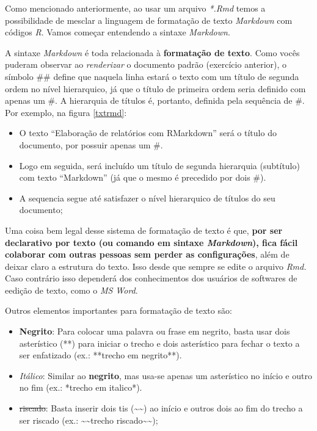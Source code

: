 \documentclass[]{book}
\providecommand{\tightlist}{%
  \setlength{\itemsep}{0pt}\setlength{\parskip}{0pt}}
\begin{document}
Como mencionado anteriormente, ao usar um arquivo \emph{*.Rmd} temos a possibilidade de mesclar a linguagem de formatação de texto \emph{Markdown} com códigos \emph{R}. Vamos começar entendendo a sintaxe \emph{Markdown}.

A sintaxe \emph{Markdown} é toda relacionada à \textbf{formatação de texto}. Como vocês puderam observar ao \emph{renderizar} o documento padrão (exercício anterior), o símbolo \#\# define que naquela linha estará o texto com um título de segunda ordem no nível hierarquico, já que o título de primeira ordem seria definido com apenas um \#. A hierarquia de títulos é, portanto, definida pela sequência de \#. Por exemplo, na figura \autoref{txtrmd}:

\begin{itemize}
\tightlist
\item
  O texto ``Elaboração de relatórios com RMarkdown'' será o título do documento, por possuir apenas um \#.
\item
  Logo em seguida, será incluído um título de segunda hierarquia (subtítulo) com texto ``Markdown'' (já que o mesmo é precedido por dois \#).\\
\item
  A sequencia segue até satisfazer o nível hierarquico de títulos do seu documento;
\end{itemize}

Uma coisa bem legal desse sistema de formatação de texto é que, \textbf{por ser declarativo por texto (ou comando em sintaxe \emph{Markdown}), fica fácil colaborar com outras pessoas sem perder as configurações}, além de deixar claro a estrutura do texto. Isso desde que sempre se edite o arquivo \emph{Rmd.} Caso contrário isso dependerá dos conhecimentos dos usuários de softwares de eedição de texto, como o \emph{MS Word}.

Outros elementos importantes para formatação de texto são:

\begin{itemize}
\tightlist
\item
  \textbf{Negrito}: Para colocar uma palavra ou frase em negrito, basta usar dois asterístico (**) para iniciar o trecho e dois asterístico para fechar o texto a ser enfatizado (ex.: **trecho em negrito**).\\
\item
  \emph{Itálico}: Similar ao \textbf{negrito}, mas usa-se apenas um asterístico no início e outro no fim (ex.: *trecho em italico*).\\
\item
  \sout{riscado}: Basta inserir dois tis (\textasciitilde{}\textasciitilde{}) ao início e outros dois ao fim do trecho a ser riscado (ex.: \textasciitilde{}\textasciitilde{}trecho riscado\textasciitilde{}\textasciitilde{});
\end{itemize}
\end{document}
